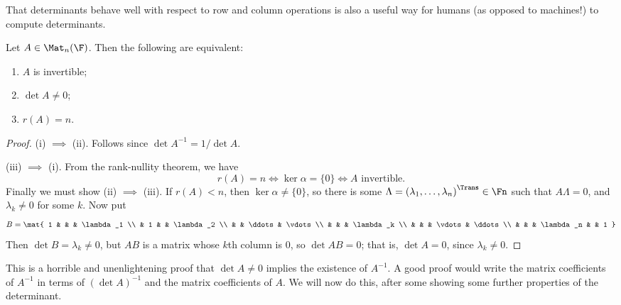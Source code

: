 \begin{remark}
	That determinants behave well with respect to row and column operations is also a useful way for humans (as opposed to machines!) to compute determinants. %
\end{remark}


\begin{proposition}
	Let $A\in \Mat_n(\F)$. Then the following are equivalent: %
	\begin{enumerate}
		\shortskip
		\item $A$ is invertible;
		\item $\det A\neq 0$;
		\item $r(A)=n$.
	\end{enumerate}
\end{proposition}

\begin{proof}
	(i) $\implies$ (ii). Follows since $\det A^{-1}=1/\det A$. %
	
	(iii) $\implies$ (i). From the rank-nullity theorem, we have
	\begin{equation*}
		r(A)=n \iff \ker\alpha=\{0\} \iff A \text{ invertible}.
	\end{equation*}
	Finally we must show (ii) $\implies$ (iii). If $r(A)<n$, then $\ker\alpha\neq \{0\}$, so there is some $\Lambda=\left( \lambda_1,\ldots,\lambda_n \right)^\Trans \in\Fn$ such that $A\Lambda=0$, and $\lambda_k\neq 0$ for some $k$. Now put %
	\begin{equation*}
		B = \mat{
			1 & & & \lambda_1 \\
			& 1 & & \lambda_2 \\
			& & \ddots & \vdots \\
			& & & \lambda_k \\
			& & & \vdots & \ddots \\
			& & & \lambda_n & & 1
		}
	\end{equation*}
Then $\det B=\lambda_k\neq 0$, but $AB$ is a matrix whose $k$th column is 0, so $\det AB=0$; that is, $\det A=0$, since $\lambda_k\neq 0$. %
\end{proof}

This is a horrible and unenlightening proof that $\det A\neq 0$ implies the existence of $A^{-1}$. A good proof would write the matrix coefficients of $A^{-1}$ in terms of $\left( \det A \right)^{-1}$ and the matrix coefficients of $A$. We will now do this, after some showing some further properties of the determinant.

